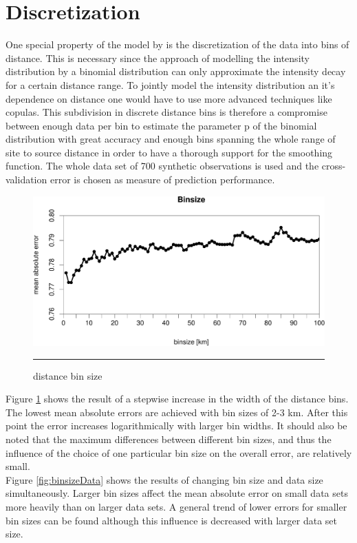 \section{Discretization}

One special property of the model by \cite{Rotondi2004} is the discretization of the data into bins of distance. This is necessary since the approach of modelling the intensity distribution by a binomial distribution can only approximate the intensity decay for a certain distance range. To jointly model the intensity distribution an it's dependence on distance one would have to use more advanced techniques like copulas. This subdivision in discrete distance bins is therefore a compromise between enough data per bin to estimate the parameter p of the binomial distribution with great accuracy and enough bins spanning the whole range of site to source distance in order to have a thorough support for the smoothing function. The whole data set of 700 synthetic observations is used and the cross-validation error is chosen as measure of prediction performance. 

\begin{figure}[!htpb]
	\centering
		\includegraphics[scale=0.33]{Figures/binsize.pdf}
		\rule{35em}{0.5pt}
	\caption[distance bin size]{distance bin size}
	\label{fig:binsize}
\end{figure}

Figure \ref{fig:binsize} shows the result of a stepwise increase in the width of the distance bins. The lowest mean absolute errors are achieved with bin sizes of 2-3 km. After this point the error increases logarithmically with larger bin widths. It should also be noted that the maximum differences between different bin sizes, and thus the influence of the choice of one particular bin size on the overall error, are relatively small.\\
Figure \ref{fig:binsizeData} shows the results of changing bin size and data size simultaneously. Larger bin sizes affect the mean absolute error on small data sets more heavily than on larger data sets. A general trend of lower errors for smaller bin sizes can be found although this influence is decreased with larger data set size.\\

